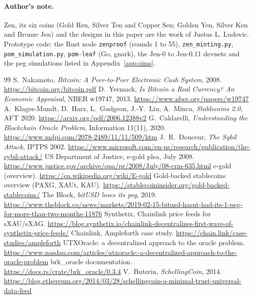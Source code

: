 \paragraph{Author's note.} Zen, its six coins (Gold Ren, Silver Ten and Copper Sen; Golden Yen, Silver Ken and Bronze Jen) and the designs in this paper are the work of Justus L. Ludovic. Prototype code: the Rust node \texttt{zenproof} (rounds 1 to 55), \texttt{zen\_minting.py}, \texttt{pom\_simulation.py}, \texttt{pom-leaf} (Go, gnark), the Jen-0 to Jen-0.11 devnets and the peg simulations listed in Appendix~\ref{app:sims}.

\begin{thebibliography}{99}\small
\setlength{\itemsep}{1pt}
 S.~Nakamoto, \emph{Bitcoin: A Peer-to-Peer Electronic Cash System}, 2008. \url{https://bitcoin.org/bitcoin.pdf}
 D.~Yermack, \emph{Is Bitcoin a Real Currency? An Economic Appraisal}, NBER w19747, 2013. \url{https://www.nber.org/papers/w19747}
 A.~Klages-Mundt, D.~Harz, L.~Gudgeon, J.-Y.~Liu, A.~Minca, \emph{Stablecoins 2.0}, AFT 2020. \url{https://arxiv.org/pdf/2006.12388v2}
 G.~Caldarelli, \emph{Understanding the Blockchain Oracle Problem}, Information 11(11), 2020. \url{https://www.mdpi.com/2078-2489/11/11/509/htm}
 J.~R.~Douceur, \emph{The Sybil Attack}, IPTPS 2002. \url{https://www.microsoft.com/en-us/research/publication/the-sybil-attack/}
 US Department of Justice, e-gold plea, July 2008. \url{https://www.justice.gov/archive/opa/pr/2008/July/08-crm-635.html}
 e-gold (overview). \url{https://en.wikipedia.org/wiki/E-gold}
 Gold-backed stablecoins overview (PAXG, XAUt, KAU). \url{https://stablecoininsider.org/gold-backed-stablecoins/}
 The Block, \emph{bitUSD loses its peg}, 2019. \url{https://www.theblock.co/news/markets/2019-02-15-bitusd-hasnt-had-its-1-peg-for-more-than-two-months-11876}
 Synthetix, Chainlink price feeds for sXAU/sXAG. \url{https://blog.synthetix.io/chainlink-decentralizes-first-wave-of-synthetix-price-feeds/}
 Chainlink, Ampleforth case study. \url{https://chain.link/case-studies/ampleforth}
 UTXOracle: a decentralized approach to the oracle problem. \url{https://www.nasdaq.com/articles/utxoracle:-a-decentralized-approach-to-the-oracle-problem}
 brk\_oracle documentation. \url{https://docs.rs/crate/brk_oracle/0.3.4}
 V.~Buterin, \emph{SchellingCoin}, 2014. \url{https://blog.ethereum.org/2014/03/28/schellingcoin-a-minimal-trust-universal-data-feed}

\end{thebibliography}
